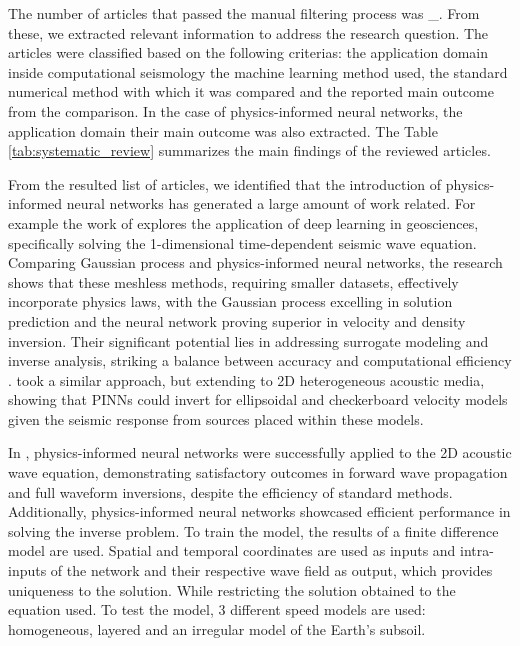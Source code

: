 \documentclass[11pt,twoside]{article}
\begin{document}
The number of articles that passed the manual filtering process was \_. From these, we extracted relevant information to 
address the research question. The articles were classified based on the following criterias: the application domain 
inside computational seismology the machine learning method used, the standard numerical method with which it was 
compared and the reported main outcome from the comparison. In the case of physics-informed neural networks, 
the application domain their main outcome was also extracted. The Table \ref{tab:systematic_review} summarizes 
the main findings of the reviewed articles. 

From the resulted list of articles, we identified that the introduction of physics-informed neural 
networks has generated a large amount of work related. For example the work of 
 explores the application of deep learning in geosciences, 
specifically solving the 1-dimensional time-dependent seismic wave equation. Comparing Gaussian process 
and physics-informed neural networks, the research shows that these meshless methods, requiring 
smaller datasets, effectively incorporate physics laws, with the Gaussian process excelling in 
solution prediction and the neural network proving superior in velocity and density inversion. 
Their significant potential lies in addressing surrogate modeling and inverse analysis, 
striking a balance between accuracy and computational efficiency \citep{Song2022}. 
 took a similar  approach, but extending to 2D heterogeneous acoustic 
media, showing that PINNs could invert for ellipsoidal and checkerboard velocity models 
given the seismic response from sources placed within these models.

In , physics-informed neural networks were successfully 
applied to the 2D acoustic wave equation, demonstrating satisfactory outcomes in forward wave propagation and 
full waveform inversions, despite the efficiency of standard methods. Additionally, physics-informed neural networks 
showcased efficient performance in solving the inverse problem. To train the model, the results of a finite difference 
model are used. Spatial and temporal coordinates are used as inputs and intra-inputs of the network and their respective 
wave field as output, which provides uniqueness to the solution. While restricting the solution obtained to the equation 
used. To test the model, 3 different speed models are used: homogeneous, layered and an irregular model of the Earth's subsoil.
\end{document}

